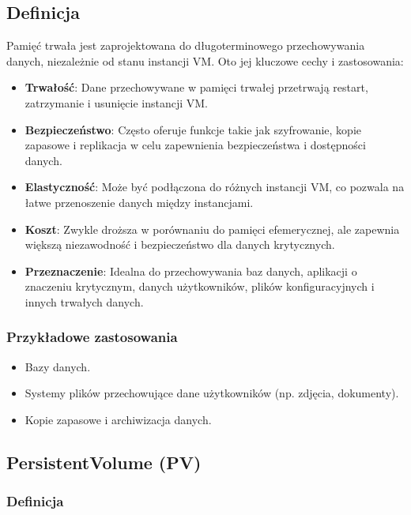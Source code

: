 \documentclass[polish,envcountsect,10pt]{article}
\begin{document}
\subsection{Definicja}

Pamięć trwała jest zaprojektowana do długoterminowego przechowywania danych, niezależnie od stanu instancji VM. Oto jej kluczowe cechy i zastosowania:

\begin{itemize}
    \item \textbf{Trwałość}: Dane przechowywane w pamięci trwałej przetrwają restart, zatrzymanie i usunięcie instancji VM.
    \item \textbf{Bezpieczeństwo}: Często oferuje funkcje takie jak szyfrowanie, kopie zapasowe i replikacja w celu zapewnienia bezpieczeństwa i dostępności danych.
    \item \textbf{Elastyczność}: Może być podłączona do różnych instancji VM, co pozwala na łatwe przenoszenie danych między instancjami.
    \item \textbf{Koszt}: Zwykle droższa w porównaniu do pamięci efemerycznej, ale zapewnia większą niezawodność i bezpieczeństwo dla danych krytycznych.
    \item \textbf{Przeznaczenie}: Idealna do przechowywania baz danych, aplikacji o znaczeniu krytycznym, danych użytkowników, plików konfiguracyjnych i innych trwałych danych.
\end{itemize}

\subsubsection{Przykładowe zastosowania}

\begin{itemize}
    \item Bazy danych.
    \item Systemy plików przechowujące dane użytkowników (np. zdjęcia, dokumenty).
    \item Kopie zapasowe i archiwizacja danych.
\end{itemize}

\subsection{PersistentVolume (PV)}

\subsubsection{Definicja}
\end{document}
